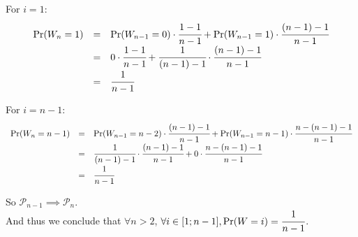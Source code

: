 \noindent
For $i = 1$:
\[\def\arraystretch{1.5}
  \begin{array}{lll}
    \Pr(W_n = 1) & = & \Pr(W_{n-1} = 0) \cdot \f{1 - 1}{n - 1} + \Pr(W_{n-1} = 1) \cdot \f{(n - 1) - 1}{n - 1} \\
                 & = & 0 \cdot \f{1 - 1}{n - 1} + \f{1}{(n - 1) - 1} \cdot \f{(n - 1) - 1}{n - 1} \\
                 & = & \f{1}{n - 1}
  \end{array}
\]

\noindent
For $i = n-1$:
\[\def\arraystretch{1.5}
  \begin{array}{lll}
    \Pr(W_n = n - 1) & = & \Pr(W_{n-1} = n - 2) \cdot \f{(n - 1) - 1}{n - 1} + \Pr(W_{n-1} = n-1) \cdot \f{n - (n-1) - 1}{n - 1} \\
                 & = & \f{1}{(n - 1) - 1} \cdot \f{(n - 1) - 1}{n - 1} + 0 \cdot \f{n - (n-1) - 1}{n - 1} \\
                 & = & \f{1}{n - 1}
  \end{array}
\]


So $\mathcal{P}_{n-1} \implies \mathcal{P}_{n}$.\\

\noindent
And thus we conclude that $\forall n > 2$, $\forall i \in [1; n-1], \Pr(W = i) = \cfrac{1}{n - 1}$.
